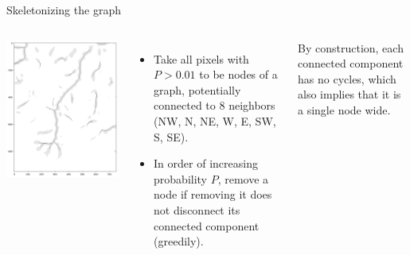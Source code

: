 \documentclass[aspectratio=169]{beamer}
\begin{document}
\begin{frame}{Skeletonizing the graph}
\vspace{0.35 cm}
\begin{columns}
\includegraphics[width=\linewidth]{img/skeletonization.png}

\begin{itemize}\setlength{\itemsep}{0.5 cm}
\item Take all pixels with $P > 0.01$ to be nodes of a graph, potentially connected to 8 neighbors (NW, N, NE, W, E, SW, S, SE).
\item In order of increasing probability $P$, remove a node if removing it does not disconnect its connected component (greedily).
\end{itemize}

\vspace{0.5 cm}
By construction, each connected component has no cycles, which also implies that it is a single node wide.
\end{columns}
\end{frame}
\end{document}
